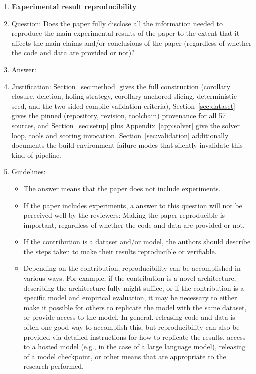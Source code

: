 \begin{enumerate}
    \item {\bf Experimental result reproducibility}
    \item[] Question: Does the paper fully disclose all the information needed to reproduce the main experimental results of the paper to the extent that it affects the main claims and/or conclusions of the paper (regardless of whether the code and data are provided or not)?
    \item[] Answer: \answerYes{}
    \item[] Justification: Section~\ref{sec:method} gives the full construction (corollary closure, deletion, holing strategy, corollary-anchored slicing, deterministic seed, and the two-sided compile-validation criteria), Section~\ref{sec:dataset} gives the pinned (repository, revision, toolchain) provenance for all 57 sources, and Section~\ref{sec:setup} plus Appendix~\ref{app:solver} give the solver loop, tools and scoring invocation. Section~\ref{sec:validation} additionally documents the build-environment failure modes that silently invalidate this kind of pipeline.
    \item[] Guidelines:
    \begin{itemize}
        \item The answer \answerNA{} means that the paper does not include experiments.
        \item If the paper includes experiments, a \answerNo{} answer to this question will not be perceived well by the reviewers: Making the paper reproducible is important, regardless of whether the code and data are provided or not.
        \item If the contribution is a dataset and\slash or model, the authors should describe the steps taken to make their results reproducible or verifiable. 
        \item Depending on the contribution, reproducibility can be accomplished in various ways. For example, if the contribution is a novel architecture, describing the architecture fully might suffice, or if the contribution is a specific model and empirical evaluation, it may be necessary to either make it possible for others to replicate the model with the same dataset, or provide access to the model. In general. releasing code and data is often one good way to accomplish this, but reproducibility can also be provided via detailed instructions for how to replicate the results, access to a hosted model (e.g., in the case of a large language model), releasing of a model checkpoint, or other means that are appropriate to the research performed.

\end{itemize}
\end{enumerate}
